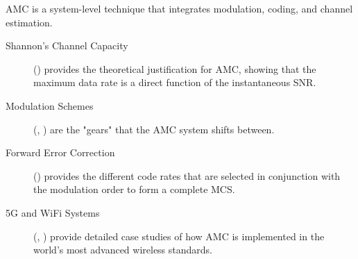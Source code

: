 \begin{importantbox}[title={Further Reading}]
    AMC is a system-level technique that integrates modulation, coding, and channel estimation.
    \begin{description}
        \item[Shannon's Channel Capacity] () provides the theoretical justification for AMC, showing that the maximum data rate is a direct function of the instantaneous SNR.
        \item[Modulation Schemes] (, ) are the "gears" that the AMC system shifts between.
        \item[Forward Error Correction] () provides the different code rates that are selected in conjunction with the modulation order to form a complete MCS.
        \item[5G and WiFi Systems] (, ) provide detailed case studies of how AMC is implemented in the world's most advanced wireless standards.
    \end{description}
\end{importantbox}